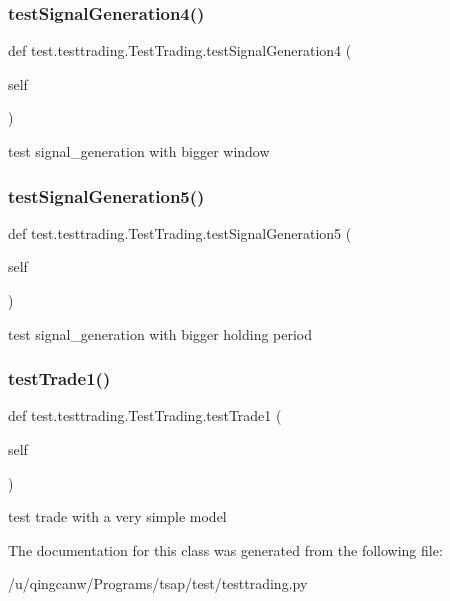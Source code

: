 \subsubsection{\texorpdfstring{test\+Signal\+Generation4()}{testSignalGeneration4()}}
{\footnotesize\ttfamily def test.\+testtrading.\+Test\+Trading.\+test\+Signal\+Generation4 (\begin{DoxyParamCaption}\item[{}]{self }\end{DoxyParamCaption})}

\begin{DoxyVerb}test signal_generation with bigger window\end{DoxyVerb}
 \mbox{\label{classtest_1_1testtrading_1_1TestTrading_a1314bb991d7ae8a7f0bb708392be6b8f}} 
\subsubsection{\texorpdfstring{test\+Signal\+Generation5()}{testSignalGeneration5()}}
{\footnotesize\ttfamily def test.\+testtrading.\+Test\+Trading.\+test\+Signal\+Generation5 (\begin{DoxyParamCaption}\item[{}]{self }\end{DoxyParamCaption})}

\begin{DoxyVerb}test signal_generation with bigger holding period\end{DoxyVerb}
 \mbox{\label{classtest_1_1testtrading_1_1TestTrading_a4684dd9999fdf9a9c7e898f6a617c1f3}} 
\subsubsection{\texorpdfstring{test\+Trade1()}{testTrade1()}}
{\footnotesize\ttfamily def test.\+testtrading.\+Test\+Trading.\+test\+Trade1 (\begin{DoxyParamCaption}\item[{}]{self }\end{DoxyParamCaption})}

\begin{DoxyVerb}test trade with a very simple model\end{DoxyVerb}
 

The documentation for this class was generated from the following file\+:\begin{DoxyCompactItemize}
\item 
/u/qingcanw/\+Programs/tsap/test/testtrading.\+py\end{DoxyCompactItemize}
